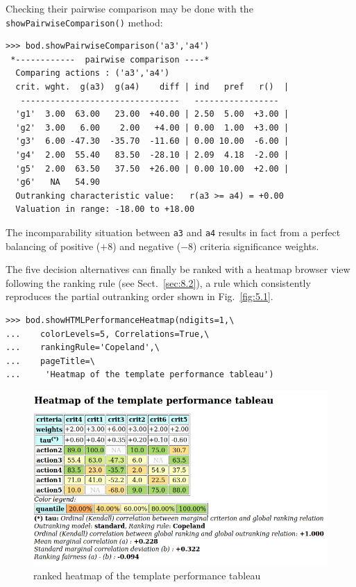 Checking their pairwise comparison may be done with the \texttt{showPairwiseCompari\-son()} method:
\begin{lstlisting}
>>> bod.showPairwiseComparison('a3','a4')
 *------------  pairwise comparison ----*
  Comparing actions : ('a3','a4')
  crit. wght.  g(a3)  g(a4)    diff | ind   pref   r()  | 
   --------------------------------   -----------------
  'g1'  3.00  63.00   23.00  +40.00 | 2.50  5.00  +3.00 | 
  'g2'  3.00   6.00    2.00   +4.00 | 0.00  1.00  +3.00 | 
  'g3'  6.00 -47.30  -35.70  -11.60 | 0.00 10.00  -6.00 | 
  'g4'  2.00  55.40   83.50  -28.10 | 2.09  4.18  -2.00 | 
  'g5'  2.00  63.50   37.50  +26.00 | 0.00 10.00  +2.00 | 
  'g6'   NA   54.90
  Outranking characteristic value:   r(a3 >= a4) = +0.00
  Valuation in range: -18.00 to +18.00
\end{lstlisting}

The incomparability situation between \texttt{a3} and \texttt{a4} results in fact from a perfect balancing of positive ($+8$) and negative ($-8$) criteria significance weights.

The five decision alternatives can finally be ranked with a heatmap browser view following the \Copeland ranking rule (see Sect.~\ref{sec:8.2}), a rule which consistently reproduces the partial outranking order shown in Fig.~\vref{fig:5.1}. 
\begin{lstlisting}
>>> bod.showHTMLPerformanceHeatmap(ndigits=1,\
...    colorLevels=5, Correlations=True,\
...    rankingRule='Copeland',\
...    pageTitle=\
...     'Heatmap of the template performance tableau')
\end{lstlisting}
\begin{figure}[ht]
\includegraphics[width=\hsize]{Figures/5-2-templateHeatmapCop.png}
\caption{\Copeland ranked heatmap of the template performance tableau}
\label{fig:5.2}       %
\end{figure}

